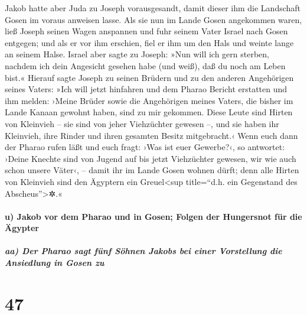  Jakob hatte aber Juda zu Joseph vorausgesandt, damit
dieser ihm die Landschaft Gosen im voraus anweisen lasse. Als sie nun im
Lande Gosen angekommen waren,  ließ Joseph seinen Wagen
anspannen und fuhr seinem Vater Israel nach Gosen entgegen; und als er
vor ihm erschien, fiel er ihm um den Hals und weinte lange an seinem
Halse.  Israel aber sagte zu Joseph: »Nun will ich gern
sterben, nachdem ich dein Angesicht gesehen habe (und weiß), daß du noch
am Leben bist.«  Hierauf sagte Joseph zu seinen Brüdern
und zu den anderen Angehörigen seines Vaters: »Ich will jetzt hinfahren
und dem Pharao Bericht erstatten und ihm melden: ›Meine Brüder sowie die
Angehörigen meines Vaters, die bisher im Lande Kanaan gewohnt haben,
sind zu mir gekommen.  Diese Leute sind Hirten von
Kleinvieh -- sie sind von jeher Viehzüchter gewesen --, und sie haben
ihr Kleinvieh, ihre Rinder und ihren gesamten Besitz mitgebracht.‹
 Wenn euch dann der Pharao rufen läßt und euch fragt:
›Was ist euer Gewerbe?‹,  so antwortet: ›Deine Knechte
sind von Jugend auf bis jetzt Viehzüchter gewesen, wir wie auch schon
unsere Väter‹, -- damit ihr im Lande Gosen wohnen dürft; denn alle
Hirten von Kleinvieh sind den Ägyptern ein Greuel\textless sup
title=``d.h. ein Gegenstand des Abscheus''\textgreater✲.«

\hypertarget{u-jakob-vor-dem-pharao-und-in-gosen-folgen-der-hungersnot-fuxfcr-die-uxe4gypter}{%
\paragraph{u) Jakob vor dem Pharao und in Gosen; Folgen der Hungersnot
für die
Ägypter}\label{u-jakob-vor-dem-pharao-und-in-gosen-folgen-der-hungersnot-fuxfcr-die-uxe4gypter}}

\hypertarget{aa-der-pharao-sagt-fuxfcnf-suxf6hnen-jakobs-bei-einer-vorstellung-die-ansiedlung-in-gosen-zu}{%
\subparagraph{aa) Der Pharao sagt fünf Söhnen Jakobs bei einer
Vorstellung die Ansiedlung in Gosen
zu}\label{aa-der-pharao-sagt-fuxfcnf-suxf6hnen-jakobs-bei-einer-vorstellung-die-ansiedlung-in-gosen-zu}}

\hypertarget{section-46}{%
\section{47}\label{section-46}}

